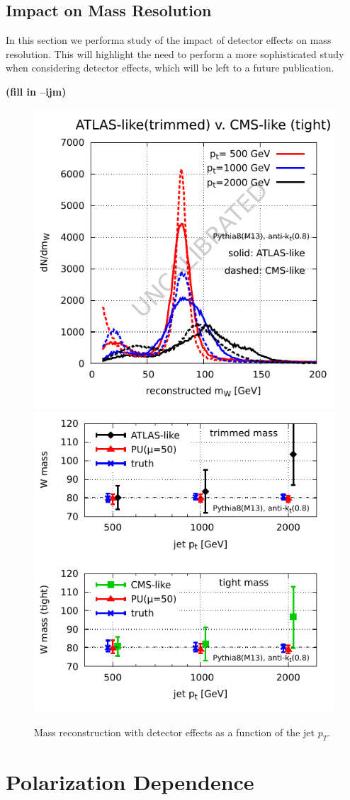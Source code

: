 \documentclass[11pt,letterpaper]{article}
\newcommand{\ijm}[1]{\textbf{\textcolor{llblue}{(#1 --ijm)}}}
\begin{document}
\subsection{Impact on Mass Resolution}\label{sec:detector_robust}

In this section we performa study of the impact of detector effects on mass resolution. This will highlight the need to perform a more sophisticated study when considering detector effects, which will be left to a future publication.

\ijm{fill in}

\begin{figure}
  \includegraphics[width=0.45\columnwidth]{figures/mass-detector.pdf}
  \hfill
  \includegraphics[width=0.45\columnwidth]{figures/mass-width-detector.pdf}
  \caption{Mass reconstruction with detector effects as a function of the jet $p_T$.}
  \label{fig:mass-detector}
\end{figure}









\section{Polarization Dependence}\label{sec:polar}
\end{document}
